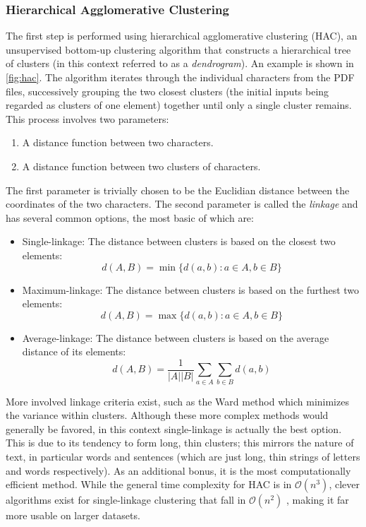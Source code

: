 \subsubsection{Hierarchical Agglomerative Clustering}
The first step is performed using hierarchical agglomerative clustering (HAC),
an unsupervised bottom-up clustering algorithm that constructs a hierarchical
tree of clusters (in this context referred to as a \emph{dendrogram}). An
example is shown in \cref{fig:hac}. The algorithm iterates through the individual
characters from the PDF files, successively grouping the two closest
clusters (the initial inputs being regarded as clusters of one element) together
until only a single cluster remains. This process involves two parameters:
\begin{enumerate}
\item A distance function between two characters.
\item A distance function between two clusters of characters.
\end{enumerate}
The first parameter is trivially chosen to be the Euclidian distance between the
coordinates of the two characters. The second parameter is called the
\emph{linkage} and has several common options, the most basic of which are:
\begin{itemize}
\item Single-linkage: The distance between clusters is based on the closest two
  elements: \[ d(A, B) = \min \{ d(a, b) : a \in A, b \in B \} \]
\item Maximum-linkage: The distance between clusters is based on the furthest two
  elements: \[ d(A, B) = \max \{ d(a, b) : a \in A, b \in B \} \]
\item Average-linkage: The distance between clusters is based on the average
  distance of its elements:
  \[ d(A, B) = \frac{1}{|A||B|} \sum_{a \in A}\sum_{b \in B} d(a, b) \]
\end{itemize}
More involved linkage criteria exist, such as the Ward method
which minimizes the variance within clusters. Although these more complex
methods would generally be favored, in this context single-linkage
is actually the best option\citep{klampfl2014unsupervised}. This is due
to its tendency to form long, thin clusters; this mirrors the nature of text, in
particular words and sentences (which are just long, thin strings of letters and
words respectively).
As an additional bonus, it is the most computationally efficient method.
While the general time complexity for HAC is
in $\mathcal{O}(n^3)$, clever algorithms exist for single-linkage clustering
that fall in $\mathcal{O}(n^2)$ \citep{sibson1973slink}, making it far more
usable on larger datasets.

